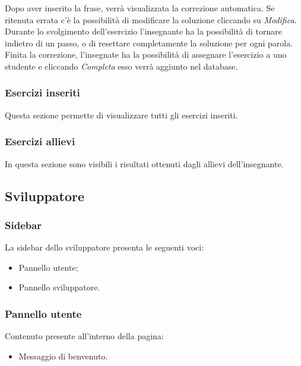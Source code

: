           Dopo aver inserito la frase, verrà visualizzata la correzione automatica. Se ritenuta errata c'è la possibilità di modificare la soluzione cliccando su \textit{Modifica}. Durante lo svolgimento dell'esercizio l'insegnante ha la possibilità di tornare indietro di un passo, o di resettare completamente la soluzione per ogni parola. Finita la correzione, l'insegnate ha la possibilità di assegnare l'esercizio a uno studente e cliccando \textit{Completa} esso verrà aggiunto nel database.
        
        
        
        \subsubsection{Esercizi inseriti}
        Questa sezione permette di visualizzare tutti gli esercizi inseriti.
        
        
        
        
        \subsubsection{Esercizi allievi}        
          In questa sezione sono visibili i risultati ottenuti dagli allievi dell'insegnante.
        
        
        
        
	\newpage
    \subsection{Sviluppatore}
    
    	\subsubsection{Sidebar} 
    	  La sidebar dello sviluppatore presenta le seguenti voci:
    		\begin{itemize}
    		\item Pannello utente;
    		\item Pannello sviluppatore.
    		\end{itemize}
    
    
    
    
    	\subsubsection{Pannello utente}
    	  Contenuto presente all'interno della pagina:
        	\begin{itemize} 
        	\item Messaggio di benvenuto.
        	\end{itemize}




